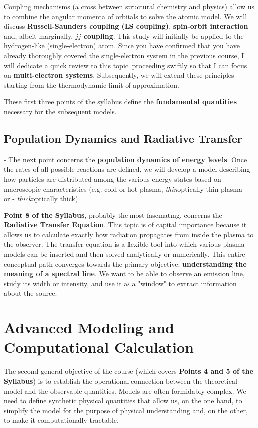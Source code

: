     Coupling mechanisms (a cross between structural chemistry and physics) allow us to combine the angular momenta of orbitals to solve the atomic model. We will discuss \textbf{Russell-Saunders coupling (LS coupling)}, \textbf{spin-orbit interaction} and, albeit marginally, \textbf{$jj$ coupling}.
    This study will initially be applied to the hydrogen-like (single-electron) atom. Since you have confirmed that you have already thoroughly covered the single-electron system in the previous course, I will dedicate a quick review to this topic, proceeding swiftly so that I can focus on \textbf{multi-electron systems}. Subsequently, we will extend these principles starting from the thermodynamic limit of approximation.
    
    These first three points of the syllabus define the \textbf{fundamental quantities} necessary for the subsequent models.
    
    \subsection{Population Dynamics and Radiative Transfer}
    
-     The next point concerns the \textbf{population dynamics of energy levels}. Once the rates of all possible reactions are defined, we will develop a model describing how particles are distributed among the various energy states based on macroscopic characteristics (e.g. cold or hot plasma, \textit{thin}optically thin plasma - or 
- \textit{thick}optically thick).
    
    \textbf{Point 8 of the Syllabus}, probably the most fascinating, concerns the \textbf{Radiative Transfer Equation}. This topic is of capital importance because it allows us to calculate exactly how radiation propagates from inside the plasma to the observer. The transfer equation is a flexible tool into which various plasma models can be inserted and then solved analytically or numerically.
    This entire conceptual path converges towards the primary objective: \textbf{understanding the meaning of a spectral line}. We want to be able to observe an emission line, study its width or intensity, and use it as a "window" to extract information about the source.

\section{Advanced Modeling and Computational Calculation}

The second general objective of the course (which covers \textbf{Points 4 and 5 of the Syllabus}) is to establish the operational connection between the theoretical model and the observable quantities.
Models are often formidably complex. We need to define synthetic physical quantities that allow us, on the one hand, to simplify the model for the purpose of physical understanding and, on the other, to make it computationally tractable.

